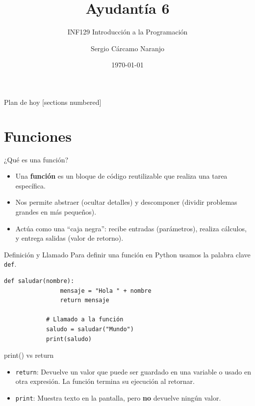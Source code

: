 \documentclass[aspectratio=169, 11pt]{beamer}
\title{Ayudantía 6}
\subtitle{INF129 Introducción a la Programación}
\author{Sergio Cárcamo Naranjo}
\institute{DI - Universidad Técnica Federico Santa María}
\date{\today}
\begin{document}
	
	\maketitle
	
	\begin{frame}{Plan de hoy}
		[sections numbered]
		\tableofcontents[hideallsubsections]
	\end{frame}
	
	\section{Funciones}
	
	\begin{frame}{¿Qué es una función?}
		\begin{itemize}
			\item Una \textbf{función} es un bloque de código reutilizable que realiza una tarea específica.
			\item Nos permite abstraer (ocultar detalles) y descomponer (dividir problemas grandes en más pequeños).
			\item Actúa como una ``caja negra'': recibe entradas (parámetros), realiza cálculos, y entrega salidas (valor de retorno).
		\end{itemize}
	\end{frame}
	
	\begin{frame}[fragile]{Definición y Llamado}
		Para definir una función en Python usamos la palabra clave \lstinline{def}.
		
		\begin{lstlisting}[gobble=3]
			def saludar(nombre):
				mensaje = "Hola " + nombre
				return mensaje
				
			# Llamado a la función
			saludo = saludar("Mundo")
			print(saludo)
		\end{lstlisting}
	\end{frame}
	
	\begin{frame}[fragile]{print() vs return}
		\begin{itemize}
			\item \lstinline{return}: Devuelve un valor que puede ser guardado en una variable o usado en otra expresión. La función termina su ejecución al retornar.
			\item \lstinline{print}: Muestra texto en la pantalla, pero \textbf{no} devuelve ningún valor.
		\end{itemize}
	\end{frame}
	
\end{document}
